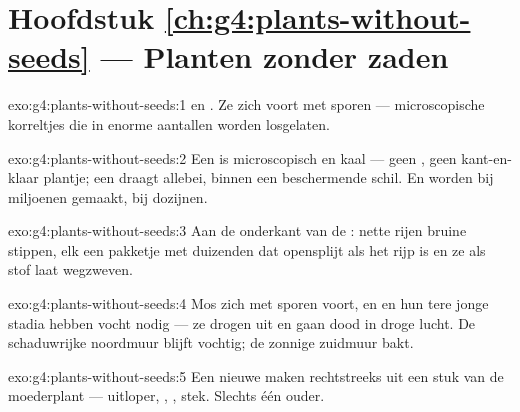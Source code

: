 \section*{Hoofdstuk \ref{ch:g4:plants-without-seeds} --- Planten zonder zaden}

\begin{solution}{exo:g4:plants-without-seeds:1}
 en . Ze  zich voort met sporen --- microscopische
korreltjes die in enorme aantallen worden losgelaten.
\end{solution}

\begin{solution}{exo:g4:plants-without-seeds:2}
Een  is microscopisch en kaal --- geen , geen
kant-en-klaar plantje; een  draagt allebei, binnen een beschermende
schil. En  worden bij miljoenen gemaakt,  bij dozijnen.
\end{solution}

\begin{solution}{exo:g4:plants-without-seeds:3}
Aan de onderkant van de : nette rijen bruine stippen, elk een
pakketje met duizenden  dat opensplijt als het rijp is en ze als
stof laat wegzweven.
\end{solution}

\begin{solution}{exo:g4:plants-without-seeds:4}
Mos  zich met sporen voort, en  en hun tere jonge stadia
hebben vocht nodig --- ze drogen uit en gaan dood in droge lucht. De
schaduwrijke noordmuur blijft vochtig; de zonnige zuidmuur bakt.
\end{solution}

\begin{solution}{exo:g4:plants-without-seeds:5}
Een nieuwe  maken rechtstreeks uit een stuk van de moederplant ---
uitloper, , , stek. Slechts één ouder.
\end{solution}

